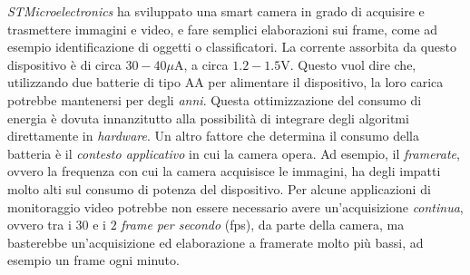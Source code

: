 \textit{STMicroelectronics} ha sviluppato una smart camera in grado di acquisire e trasmettere immagini e video, e fare semplici elaborazioni sui frame, come ad esempio identificazione di oggetti o classificatori.
La corrente assorbita da questo dispositivo \`e di circa $30-40 \mu \text{A}$, a circa $1.2-1.5 \text{V}$.
Questo vuol dire che, utilizzando due batterie di tipo AA per alimentare il dispositivo, la loro carica potrebbe mantenersi per degli \textit{anni}.
Questa ottimizzazione del consumo di energia \`e dovuta innanzitutto alla possibilit\`a di integrare degli algoritmi direttamente in \textit{hardware}.
Un altro fattore che determina il consumo della batteria \`e il \textit{contesto applicativo} in cui la camera opera.
Ad esempio, il \textit{framerate}, ovvero la frequenza con cui la camera acquisisce le immagini, ha degli impatti molto alti sul consumo di potenza del dispositivo.
Per alcune applicazioni di monitoraggio video potrebbe non essere necessario avere un'acquisizione \textit{continua}, ovvero tra i $30$ e i $2$ \textit{frame per secondo} (fps), da parte della camera, ma basterebbe un'acquisizione ed elaborazione a framerate molto pi\`u bassi, ad esempio un frame ogni minuto.
%
%
